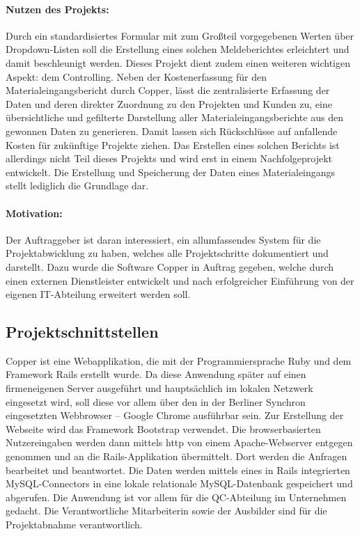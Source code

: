 \paragraph*{Nutzen des Projekts: } Durch ein standardisiertes Formular mit zum Großteil vorgegebenen Werten über Dropdown-Listen soll die Erstellung eines solchen Meldeberichtes erleichtert und damit beschleunigt werden. Dieses Projekt dient zudem einen weiteren wichtigen Aspekt: dem Controlling. Neben der Kostenerfassung für den Materialeingangsbericht durch Copper, lässt die zentralisierte Erfassung der Daten und deren direkter Zuordnung zu den Projekten und Kunden zu, eine übersichtliche und gefilterte Darstellung aller Materialeingangsberichte aus den gewonnen Daten zu generieren. Damit lassen sich Rückschlüsse auf anfallende Kosten für zukünftige Projekte ziehen. Das Erstellen eines solchen Berichts ist allerdings nicht Teil dieses Projekts und wird erst in einem Nachfolgeprojekt entwickelt. Die Erstellung und Speicherung der Daten eines Materialeingangs stellt lediglich die Grundlage dar.

\paragraph*{Motivation: } Der Auftraggeber ist daran interessiert, ein allumfassendes System für die Projektabwicklung zu haben, welches alle Projektschritte dokumentiert und darstellt. Dazu wurde die Software Copper in Auftrag gegeben, welche durch einen externen Dienstleister entwickelt und nach erfolgreicher Einführung von der eigenen IT-Abteilung erweitert werden soll.

\subsection{Projektschnittstellen} 
\label{sec:Projektschnittstellen}
Copper ist eine Webapplikation, die mit der Programmiersprache Ruby und dem Framework Rails erstellt wurde. Da diese Anwendung später auf einen firmeneigenen Server ausgeführt und hauptsächlich im lokalen Netzwerk eingesetzt wird, soll diese vor allem über den in der Berliner Synchron eingesetzten Webbrowser – Google Chrome ausführbar sein. Zur Erstellung der Webseite wird das Framework Bootstrap verwendet. Die browserbasierten Nutzereingaben werden dann mittels http von einem Apache-Webserver entgegen genommen und an die Rails-Applikation übermittelt. Dort werden die Anfragen bearbeitet und beantwortet. Die Daten werden mittels eines in Rails integrierten MySQL-Connectors in eine lokale relationale MySQL-Datenbank gespeichert und abgerufen. Die Anwendung ist vor allem für die QC-Abteilung im Unternehmen gedacht. Die Verantwortliche Mitarbeiterin sowie der Ausbilder sind für die Projektabnahme verantwortlich.

